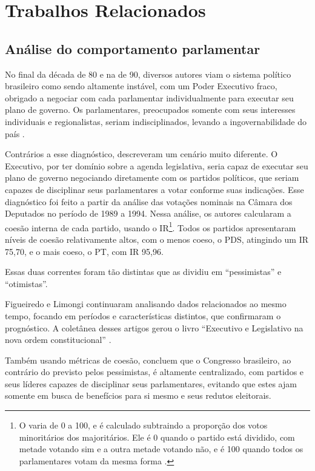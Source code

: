 \chapter{Trabalhos Relacionados}\label{cap:trabalhos-relacionados}


\section{Análise do comportamento parlamentar}
\label{cap:trabalhos-relacionados:analise-comportamento}

No final da década de 80 e na de 90, diversos autores viam o sistema político
brasileiro como sendo altamente instável, com um Poder Executivo fraco,
obrigado a negociar com cada parlamentar individualmente para executar seu
plano de governo. Os parlamentares, preocupados somente com seus interesses
individuais e regionalistas, seriam indisciplinados, levando a
ingovernabilidade do país
\cite{Abranches1988,Lamounier1994,Mainwaring2001,Ames2003}.

Contrários a esse diagnóstico,  descreveram um cenário
muito diferente. O Executivo, por ter domínio sobre a agenda legislativa,
seria capaz de executar seu plano de governo negociando diretamente com os partidos
políticos, que seriam capazes de disciplinar seus parlamentares a votar
conforme suas indicações. Esse diagnóstico foi feito a partir da análise das
votações nominais na Câmara dos Deputados no período de 1989 a 1994. Nessa
análise, os autores calcularam a coesão interna de cada partido, usando o
\gls{IR}\footnote{O  varia de 0 a 100, e é calculado subtraindo a
proporção dos votos minoritários dos majoritários. Ele é 0 quando o partido
está dividido, com metade votando sim e a outra metade votando não, e é 100
quando todos os parlamentares votam da mesma forma \cite{Rice1924}.}. Todos os
partidos apresentaram níveis de coesão relativamente altos, com o menos coeso,
o PDS, atingindo um \gls{IR} 75,70, e o mais coeso, o PT, com \gls{IR} 95,96.

Essas duas correntes foram tão distintas que  as dividiu
em ``pessimistas'' e ``otimistas''.

Figueiredo e Limongi continuaram analisando dados relacionados ao mesmo tempo,
focando em períodos e características distintos, que confirmaram o prognóstico.
A coletânea desses artigos gerou o livro ``Executivo e Legislativo na nova
ordem constitucional'' \cite{Figueiredo2001}.

Também usando métricas de coesão,  concluem que o
Congresso brasileiro, ao contrário do previsto pelos pessimistas, é altamente
centralizado, com partidos e seus líderes capazes de disciplinar seus
parlamentares, evitando que estes ajam somente em busca de benefícios para si
mesmo e seus redutos eleitorais.

